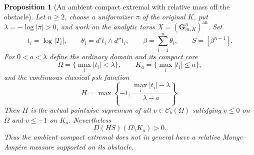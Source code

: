 \documentclass[11pt,a4paper]{article}
\numberwithin{equation}{section}
\newtheorem{proposition}[theorem]{Proposition}
\theoremstyle{definition}
\theoremstyle{remark}
\newcommand{\Cb}{\mathcal C_b}
\begin{document}
\begin{proposition}[An ambient compact extremal with relative mass off the obstacle]
\label{prop:r3-compact-relative-contact-false}
Let $n\geq2$, choose a uniformizer $\pi$ of the original $K$,
put $\lambda=-\log|\pi|>0$, and work on the analytic torus
$X=(\mathbf G_{m,K}^n)^{\mathrm{an}}$. Set
\[
 t_i=\log|T_i|,\qquad
 \theta_i=d't_i\wedge d''t_i,\qquad
 \beta=\sum_{i=1}^n\theta_i,
 \qquad S=[\beta^{n-1}].
\]
For $0<a<\lambda$ define the ordinary domain and its compact core
\[
 \Omega=\{\max_i|t_i|<\lambda\},\qquad
 K_a=\{\max_i|t_i|\leq a\},
\]
and the continuous classical psh function
\[
 H=\max\left\{-1,
          \frac{\max_i|t_i|-\lambda}{\lambda-a}\right\}.
\]
Then $H$ is the actual pointwise supremum of all
$v\in\Cb(\Omega)$ satisfying $v\leq0$ on $\Omega$ and
$v\leq-1$ on $K_a$. Nevertheless
\[
 D(HS)(\Omega\setminus K_a)>0.
\]
Thus the ambient compact extremal does not in general have a
relative Monge--Amp\`ere measure supported on its obstacle.
\end{proposition}
\end{document}
